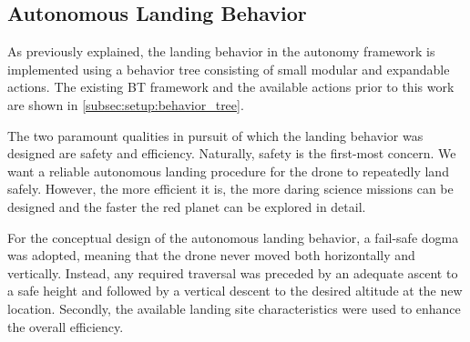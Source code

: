 \subsection{Autonomous Landing Behavior}

As previously explained, the landing behavior in the autonomy framework is implemented using a behavior tree consisting of small modular and expandable actions. The existing BT framework and the available actions prior to this work are shown in \cref{subsec:setup:behavior_tree}.

The two paramount qualities in pursuit of which the landing behavior was designed are safety and efficiency. Naturally, safety is the first-most concern. We want a reliable autonomous landing procedure for the drone to repeatedly land safely. However, the more efficient it is, the more daring science missions can be designed and the faster the red planet can be explored in detail.

For the conceptual design of the autonomous landing behavior, a fail-safe dogma was adopted, meaning that the drone never moved both horizontally and vertically. Instead, any required traversal was preceded by an adequate ascent to a safe height and followed by a vertical descent to the desired altitude at the new location. Secondly, the available landing site characteristics were used to enhance the overall efficiency. 

